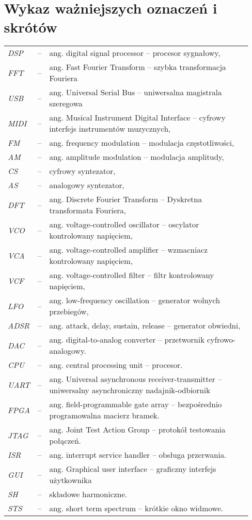 \chapter*{Wykaz ważniejszych oznaczeń i skrótów}

\begin{tabular}{lcl}
	\textit{DSP} & -- & ang. digital signal processor -- procesor sygnałowy, \\
	\textit{FFT} & -- & ang. Fast Fourier Transform -- szybka transformacja Fouriera \\
	\textit{USB} & -- & ang. Universal Serial Bus -- uniwersalna magistrala szeregowa \\
	\textit{MIDI} & -- & ang. Musical Instrument Digital Interface -- cyfrowy interfejs instrumentów muzycznych, \\
	\textit{FM} & -- & ang. frequency modulation -- modulacja częstotliwości, \\
	\textit{AM} & -- & ang. amplitude modulation -- modulacja amplitudy, \\
	\textit{CS} & -- & cyfrowy syntezator, \\
	\textit{AS} & -- & analogowy syntezator, \\
	\textit{DFT} & -- & ang. Discrete Fourier Transform -- Dyskretna transformata Fouriera, \\
	\textit{VCO} & -- & ang. voltage-controlled oscillator -- oscylator kontrolowany napięciem, \\
	\textit{VCA} & -- & ang. voltage-controlled amplifier -- wzmacniacz kontrolowany napięciem, \\
	\textit{VCF} & -- & ang. voltage-controlled filter -- filtr kontrolowany napięciem, \\
	\textit{LFO} & -- & ang. low-frequency oscillation -- generator wolnych przebiegów, \\
	\textit{ADSR} & -- & ang. attack, delay, sustain, release -- generator obwiedni, \\
	\textit{DAC} & -- & ang. digital-to-analog converter -- przetwornik cyfrowo-analogowy. \\
	\textit{CPU} & -- & ang. central processing unit -- procesor. \\
	\textit{UART} & -- & ang. Universal asynchronous receiver-transmitter -- uniwersalny asynchroniczny nadajnik-odbiornik \\
	\textit{FPGA} & -- & ang. field-programmable gate array -- bezpośrednio programowalna macierz bramek. \\
	\textit{JTAG} & -- & ang. Joint Test Action Group -- protokół testowania połączeń. \\
	\textit{ISR} & -- & ang. interrupt service handler -- obsługa przerwania. \\
	\textit{GUI} & -- & ang. Graphical user interface -- graficzny interfejs użytkownika \\
	\textit{SH} & -- & składowe harmoniczne. \\
	\textit{STS} & -- & ang. short term spectrum -- krótkie okno widmowe. \\
\end{tabular} 
